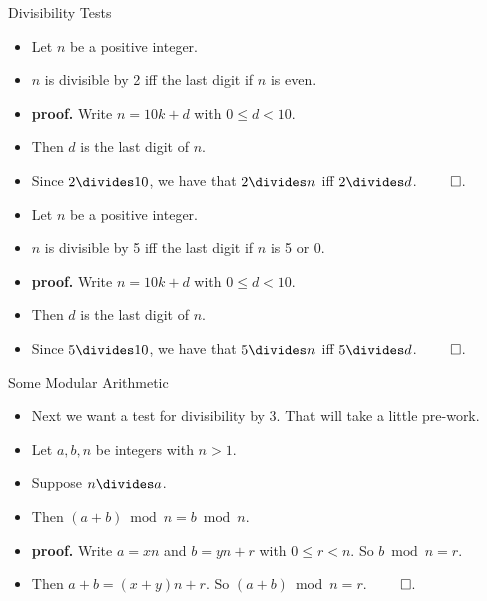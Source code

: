 \documentclass[handout]{beamer}
\begin{document}
\begin{frame}{Divisibility Tests}
\begin{itemize}
  \item Let $n$ be a positive integer.
  \item $n$ is divisible by 2 iff the last digit if $n$ is even.
  \item \textbf{proof.} Write $n=10k + d$ with $0\leq d < 10$.
  \item Then $d$ is the last digit of $n$.
  \item Since $2\divides 10$, we have that $2\divides n$ iff $2\divides d$. $\qed$.
  \item Let $n$ be a positive integer.
  \item $n$ is divisible by 5 iff the last digit if $n$ is 5 or 0.
  \item \textbf{proof.} Write $n=10k + d$ with $0\leq d < 10$.
  \item Then $d$ is the last digit of $n$.
  \item Since $5\divides 10$, we have that $5\divides n$ iff $5\divides d$. $\qed$.
\end{itemize}

\end{frame}

\begin{frame}{Some Modular Arithmetic}
\begin{itemize}
  \item Next we want a test for divisibility by 3. That will take a little pre-work.
  \item Let $a,b,n$ be integers with $n>1$.
  \item Suppose $n\divides a$.
  \item Then $(a+b) \bmod n = b \bmod n$.
  \item \textbf{proof.} Write $a=xn$ and $b=yn+r$ with $0\leq r < n$. So $b \bmod n = r$.
  \item Then $a+b = (x+y)n + r$. So $(a+b) \bmod n = r$. $\qed$.
\end{itemize}
\end{frame}
\end{document}
